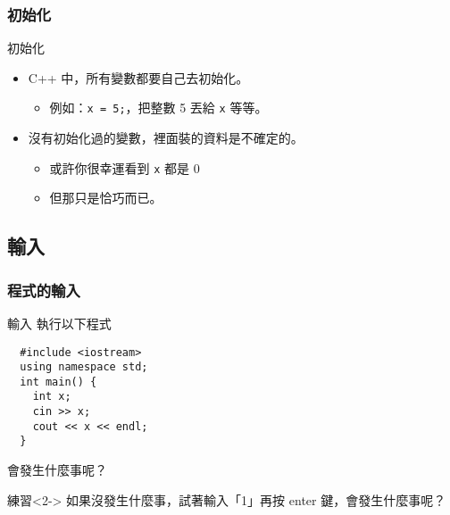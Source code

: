 \documentclass[utf8]{beamer}
\begin{document}
\begin{CJK}{UTF8}{bkai}
\begin{frame}[fragile]
  \frametitle{初始化}
  \begin{alertblock}{初始化}
    \begin{itemize}[<+->]
    \item C++ 中，所有變數都要自己去\alert{初始化}。
      \begin{itemize}
      \item 例如：\lstinline{x = 5;}{}，把整數 5 丟給 \lstinline{x}{} 等等。
      \end{itemize}
    \item 沒有初始化過的變數，裡面裝的資料是\alert{不確定}的。
      \begin{itemize}[<+->]
      \item 或許你很幸運看到 \lstinline{x}{} 都是 0
      \item 但那只是\alert{恰巧}而已。
      \end{itemize}
    \end{itemize}
  \end{alertblock}
\end{frame}

\subsection{輸入}

\begin{frame}[fragile]
  \frametitle{程式的輸入}
  \begin{block}{輸入}
    執行以下程式
    \begin{lstlisting}
  #include <iostream>
  using namespace std;
  int main() {
    int x;
    cin >> x;
    cout << x << endl;
  }
    \end{lstlisting}
    會發生什麼事呢？
  \end{block}
  \begin{block}{練習}<2->
  如果沒發生什麼事，試著輸入「1」再按 enter 鍵，會發生什麼事呢？
  \end{block}
\end{frame}


\end{CJK}
\end{document}
